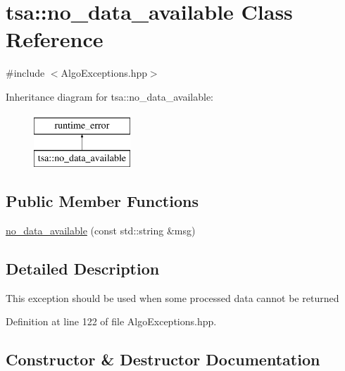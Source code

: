 \hypertarget{classtsa_1_1no__data__available}{}\section{tsa\+:\+:no\+\_\+data\+\_\+available Class Reference}
\label{classtsa_1_1no__data__available}


{\ttfamily \#include $<$Algo\+Exceptions.\+hpp$>$}

Inheritance diagram for tsa\+:\+:no\+\_\+data\+\_\+available\+:\begin{figure}[H]
\begin{center}
\leavevmode
\includegraphics[height=2.000000cm]{classtsa_1_1no__data__available}
\end{center}
\end{figure}
\subsection*{Public Member Functions}
\begin{DoxyCompactItemize}
\item 
\hyperlink{classtsa_1_1no__data__available_aae9e61590d1ca7174180eb4b5c190930}{no\+\_\+data\+\_\+available} (const std\+::string \&msg)
\end{DoxyCompactItemize}


\subsection{Detailed Description}
This exception should be used when some processed data cannot be returned 

Definition at line 122 of file Algo\+Exceptions.\+hpp.



\subsection{Constructor \& Destructor Documentation}
\mbox{\label{classtsa_1_1no__data__available_aae9e61590d1ca7174180eb4b5c190930}} 
